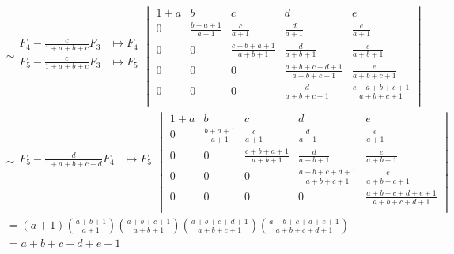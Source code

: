     \[
        \begin{aligned}
            &\sim
            \begin{aligned}
                F_4 -\frac{c}{1 + a + b + c}F_3 &\mapsto F_4 \\
                F_5 -\frac{c}{1 + a + b + c}F_3 &\mapsto F_5 \\
            \end{aligned}
            \begin{vmatrix}
                1 + a & b & c & d & e \\
                0 & \frac{b + a + 1}{a + 1} & \frac{c}{a + 1} & \frac{d}{a + 1} & \frac{e}{a + 1} \\
                0 & 0 & \frac{c + b + a + 1}{a + b + 1} & \frac{d}{a + b + 1} & \frac{e}{a+b+1} \\
                0 & 0 & 0 & \frac{a + b + c + d + 1}{a + b + c + 1} & \frac{e}{a + b + c + 1} \\
                0 & 0 & 0 & \frac{d}{a + b + c + 1} & \frac{e + a + b + c + 1}{a + b + c + 1} \\
            \end{vmatrix}
            \\
            &\sim
            \begin{aligned}
                F_5 -\frac{d}{1 + a + b + c + d}F_4 &\mapsto F_5 \\
            \end{aligned}
            \begin{vmatrix}
                1 + a & b & c & d & e \\
                0 & \frac{b + a + 1}{a + 1} & \frac{c}{a + 1} & \frac{d}{a + 1} & \frac{e}{a + 1} \\
                0 & 0 & \frac{c + b + a + 1}{a + b + 1} & \frac{d}{a + b + 1} & \frac{e}{a+b+1} \\
                0 & 0 & 0 & \frac{a + b + c + d + 1}{a + b + c + 1} & \frac{e}{a + b + c + 1} \\
                0 & 0 & 0 & 0 & \frac{a + b + c + d + e + 1}{a + b + c + d + 1} \\
            \end{vmatrix}
            \\
            &=
            \left(a + 1\right)
            \left(\frac{a + b + 1}{a + 1}\right)
            \left(\frac{a + b + c + 1}{a + b + 1}\right)
            \left(\frac{a + b + c + d + 1}{a + b + c + 1}\right)
            \left(\frac{a + b + c + d + e + 1}{a + b + c + d + 1}\right)
            \\
            &=
            a + b + c + d + e + 1
        \end{aligned}
    \]
